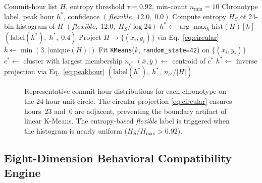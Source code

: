 \documentclass[conference]{IEEEtran}
\begin{document}
\begin{algorithm}[t]
\caption{Circular-Coordinate Chronotype Detection}
\label{alg:chrono}
\begin{algorithmic}[1]
  \Require Commit-hour list $H$, entropy threshold $\tau = 0.92$,
           min-count $n_{\min} = 10$
  \Ensure  Chronotype label, peak hour $h^*$, confidence
    \State \Return $(\textit{flexible},\;12.0,\;0.0)$
  \EndIf
  \State Compute entropy $H_S$ of 24-bin histogram of $H$
    \State \Return $(\textit{flexible},\;12.0,\;H_S/\log 24)$
  \EndIf
    \State $h^* \leftarrow \arg\max_h \text{hist}(H)[h]$
    \State \Return $(\mathrm{label}(h^*),\;h^*,\;0.4)$
  \EndIf
  \State Project $H \to \{(x_i,y_i)\}$ via Eq.~\eqref{eq:circular}
  \State $k \leftarrow \min(3,|\text{unique}(H)|)$
  \State Fit \texttt{KMeans}($k$, \texttt{random\_state=42}) on $\{(x_i,y_i)\}$
  \State $c^* \leftarrow$ cluster with largest membership $n_{c^*}$
  \State $(\bar{x},\bar{y}) \leftarrow$ centroid of $c^*$
  \State $h^* \leftarrow$ inverse projection via Eq.~\eqref{eq:peakhour}
  \State \Return $(\mathrm{label}(h^*),\;h^*,\;n_{c^*}/|H|)$
\end{algorithmic}
\end{algorithm}

\begin{figure}[t]
  \centering
  \caption{Representative commit-hour distributions for each
    chronotype on the 24-hour unit circle.
    The circular projection \eqref{eq:circular} ensures hours~23
    and~0 are adjacent, preventing the boundary artifact of linear
    K-Means.
    The entropy-based \textit{flexible} label is triggered when the
    histogram is nearly uniform ($H_S/H_{\max} > 0.92$).}
  \label{fig:polar}
\end{figure}

\subsection{Eight-Dimension Behavioral Compatibility Engine}
\label{sec:compat}
\end{document}
